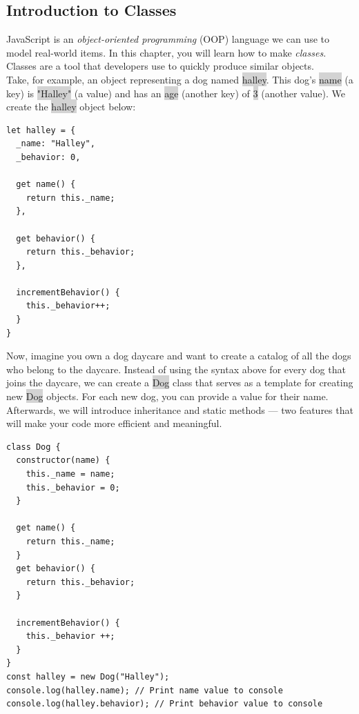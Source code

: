 \documentclass[11pt]{article}
\begin{document}
\subsection{Introduction to Classes}
JavaScript is an \textit{object-oriented programming} (OOP) language we can use to model real-world items. In this chapter, you will learn how to make \textit{classes}. Classes are a tool that developers use to quickly produce similar objects. \\
\newline
Take, for example, an object representing a dog named \colorbox{lightgray}{halley}. This dog’s \colorbox{lightgray}{name} (a key) is \colorbox{lightgray}{"Halley"} (a value) and has an \colorbox{lightgray}{age} (another key) of \colorbox{lightgray}{3} (another value). We create the \colorbox{lightgray}{halley} object below:
\begin{lstlisting}
let halley = {
  _name: "Halley",
  _behavior: 0,

  get name() {
    return this._name;
  },

  get behavior() {
    return this._behavior;
  },

  incrementBehavior() {
    this._behavior++;
  }
}
\end{lstlisting}
Now, imagine you own a dog daycare and want to create a catalog of all the dogs who belong to the daycare. Instead of using the syntax above for every dog that joins the daycare, we can create a \colorbox{lightgray}{Dog} class that serves as a template for creating new \colorbox{lightgray}{Dog} objects. For each new dog, you can provide a value for their name. Afterwards, we will introduce inheritance and static methods — two features that will make your code more efficient and meaningful. 
\begin{lstlisting}
class Dog {
  constructor(name) {
    this._name = name;
    this._behavior = 0;
  }

  get name() {
    return this._name;
  }
  get behavior() {
    return this._behavior;
  }   

  incrementBehavior() {
    this._behavior ++;
  }
}
const halley = new Dog("Halley");
console.log(halley.name); // Print name value to console
console.log(halley.behavior); // Print behavior value to console
\end{lstlisting}
\end{document}
